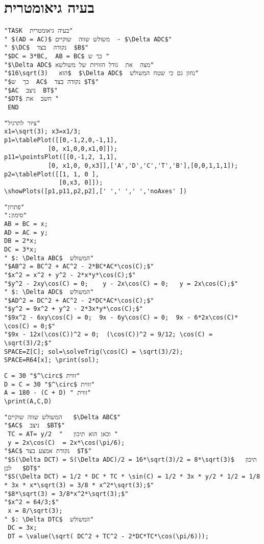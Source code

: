 \section{בעיה גיאומטרית} 

\begin{verbatim}
"TASK  בעיה גיאומטרית"  
" $(AD = AC)$ משולש שווה  שוקיים  - $\Delta ADC$"
" $\DC$  נקודה  בצד  $B$"
"$DC = 3*BC,  AB = BC$ כך ש "
"$\Delta ADC$ מצה  את  גודל הזוויות של משולשא"
"$16\sqrt(3)   הוא$  $\Delta ADC$  נחון גם כי שטח המשולש"
"$כך  ש  AC$  נקודה בצד $T$"
"$AC  ניצב  BT$"
"$DT$ חשב  את "
 END
\end{verbatim}

\vspace*{-3mm} 

\begin{verbatim}
"ציור לתרגיל"
x1=\sqrt(3); x3=x1/3;
p1=\tablePlot([[0,-1,2,0,-1,1],
            [0, x1,0,0,x1,0]]);
p11=\pointsPlot([[0,-1,2, 1,1],
            [0, x1,0, 0,x3]],['A','D','C','T','B'],[0,0,1,1,1]);
p2=\tablePlot([[1, 1, 0 ],
               [0,x3, 0]]);
\showPlots([p1,p11,p2,p2],[' ',' ',' ','noAxes' ])
\end{verbatim}

\vspace*{-3mm} 

\begin{verbatim}
"פתרון"
":סימון"
AB = BC = x;
AD = AC = y;
DB = 2*x;
DC = 3*x;
" $: \Delta ABC$  המשולש"
"$AB^2 = BC^2 + AC^2 - 2*BC*AC*\cos(C);$"
"$x^2 = x^2 + y^2 - 2*x*y*\cos(C);$"
"$y^2 - 2xy\cos(C) = 0;    y - 2x\cos(C) = 0;   y = 2x\cos(C);$"
" $: \Delta ADC$  המשולש"
"$AD^2 = DC^2 + AC^2 - 2*DC*AC*\cos(C);$"
"$y^2 = 9x^2 + y^2 - 2*3x*y*\cos(C);$"
"$9x^2 - 6xy\cos(C) = 0;  9x - 6y\cos(C) = 0;  9x - 6*2x\cos(C)* \cos(C) = 0;$"
"$9x - 12x(\cos(C))^2 = 0;  (\cos(C))^2 = 9/12; \cos(C) = \sqrt(3)/2;$"
SPACE=Z[C]; sol=\solveTrig(\cos(C) = \sqrt(3)/2); 
SPACE=R64[x]; \print(sol);
\end{verbatim}

\vspace*{-3mm} 

\begin{verbatim}
C = 30 "$^\circ$ זווית"
D = C = 30 "$^\circ$ זווית"
A = 180 - (C + D) " זווית" 
\print(A,C,D)
\end{verbatim}


\vspace*{-3mm} 

\begin{verbatim}
"המשולש שווה שוקיים   $\Delta ABC$"
"$AC$  ניצב  $BT$"
 TC = AT= y/2  "   וכאן הוא תיכון "
 y = 2x\cos(C)  = 2x*\cos(\pi/6); 
"$AC$ נקודת אמצע בצד  $T$"
"$S(\Delta DCT) = S(\Delta ADC)/2 = 16*\sqrt(3)/2 = 8*\sqrt(3)$   תיכון לכן   $DT$"
"$S(\Delta DCT) = 1/2 * DC * TC * \sin(C) = 1/2 * 3x * y/2 * 1/2 = 1/8 * 3x * x*\sqrt(3) = 3/8 * x^2*\sqrt(3);$"
"$8*\sqrt(3) = 3/8*x^2*\sqrt(3);$"
"$x^2 = 64/3;$"  
 x = 8/\sqrt(3);
" $: \Delta DTC$  המשולש"
 DC = 3x; 
 DT = \value(\sqrt( DC^2 + TC^2 - 2*DC*TC*\cos(\pi/6)));
\end{verbatim}